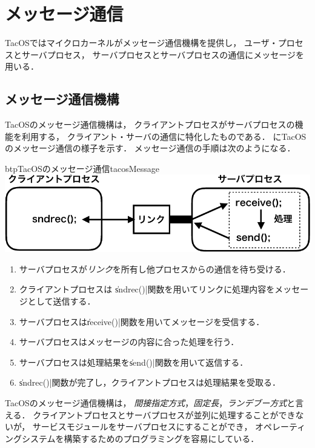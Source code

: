 \chapter{メッセージ通信}
\label{tacosIPC}
TacOSではマイクロカーネルがメッセージ通信機構を提供し，
ユーザ・プロセスとサーバプロセス，
サーバプロセスとサーバプロセスの通信にメッセージを用いる．

\section{メッセージ通信機構}
TacOSのメッセージ通信機構は，
クライアントプロセスがサーバプロセスの機能を利用する，
クライアント・サーバの通信に特化したものである．
にTacOSのメッセージ通信の様子を示す．
メッセージ通信の手順は次のようになる．

\begin{myfig}{btp}{TacOSのメッセージ通信}{tacosMessage}
  \includegraphics[scale=0.66]{Fig/tacosMessage-crop.pdf}
\end{myfig}

\begin{enumerate}
\item サーバプロセスが\emph{リンク}を所有し他プロセスからの通信を待ち受ける．
\item クライアントプロセスは
  \|sndrec()|関数を用いてリンクに処理内容をメッセージとして送信する．
  \item サーバプロセスは\|receive()|関数を用いてメッセージを受信する．
  \item サーバプロセスはメッセージの内容に合った処理を行う．
  \item サーバプロセスは処理結果を\|send()|関数を用いて返信する．
  \item \|sndrec()|関数が完了し，クライアントプロセスは処理結果を受取る．
\end{enumerate}

TacOSのメッセージ通信機構は，
\emph{間接指定方式}，\emph{固定長}，\emph{ランデブー方式}と言える．
クライアントプロセスとサーバプロセスが並列に処理することができないが，
サービスモジュールをサーバプロセスにすることができ，
オペレーティングシステムを構築するためのプログラミングを容易にしている．

